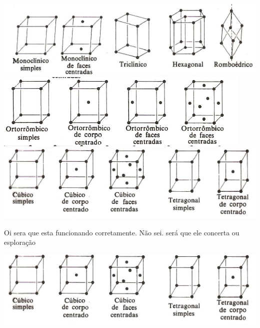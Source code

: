  \includegraphics[scale=0.5,trim={0 0 0 0}]{figures/var1.png}
 \includegraphics[scale=0.45,trim={0 0 0 0}]{figures/var2.png}
 \includegraphics[scale=0.5,trim={0 0 0 0}]{figures/var3.png}


 Oi sera que esta funcionando corretamente. Não sei. será que ele concerta ou esploração 
 
 \includegraphics[scale=0.5,trim={0 0 0 0}]{figures/var3.png}

